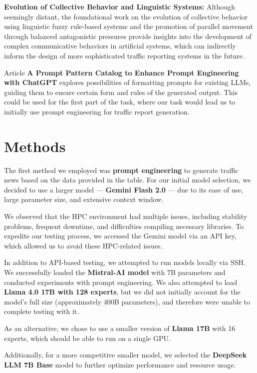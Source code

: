 \documentclass[fleqn,moreauthors,10pt]{ds_report}
\begin{document}
\textbf{Evolution of Collective Behavior and Linguistic Systems:} Although seemingly distant, the foundational work on the evolution of collective behavior using linguistic fuzzy rule-based systems \cite{Demsar2017LinguisticEvolution} and the promotion of parallel movement through balanced antagonistic pressures \cite{Demsar2016BalancedMixture} provide insights into the development of complex communicative behaviors in artificial systems, which can indirectly inform the design of more sophisticated traffic reporting systems in the future.
 
Article \textbf{A Prompt Pattern Catalog to Enhance Prompt Engineering with ChatGPT} explores possibilities of formatting prompts for existing LLMs, guiding them to ensure certain form and rules of the generated output. This could be used for the first part of the task, where our task would lead us to initially use prompt engineering for traffic report generation.

\section*{Methods}


The first method we employed was \textbf{prompt engineering} to generate traffic news based on the data provided in the table. For our initial model selection, we decided to use a larger model — \textbf{Gemini Flash 2.0} — due to its ease of use, large parameter size, and extensive context window.

We observed that the HPC environment had multiple issues, including stability problems, frequent downtime, and difficulties compiling necessary libraries. To expedite our testing process, we accessed the Gemini model via an API key, which allowed us to avoid these HPC-related issues.

In addition to API-based testing, we attempted to run models locally via SSH. We successfully loaded the \textbf{Mistral-AI model} with 7B parameters and conducted experiments with prompt engineering. We also attempted to load \textbf{Llama 4.0 17B with 128 experts}, but we did not initially account for the model’s full size (approximately 400B parameters), and therefore were unable to complete testing with it.

As an alternative, we chose to use a smaller version of \textbf{Llama 17B} with 16 experts, which should be able to run on a single GPU. 

Additionally, for a more competitive smaller model, we selected the \textbf{DeepSeek LLM 7B Base} model to further optimize performance and resource usage.
\end{document}
